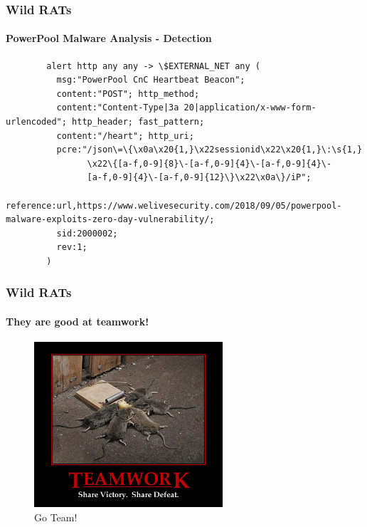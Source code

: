 \documentclass[aspectratio=169]{beamer}
\begin{document}
\begin{frame}[fragile]{}
  \frametitle{Wild RATs}
  \framesubtitle{PowerPool Malware Analysis - Detection}
  \begin{center}
    \begin{tcolorbox}[title=powerpool.rules,colback=black]
    \begin{minipage}{0.5\textwidth}
      \begin{verbatim}
        alert http any any -> \$EXTERNAL_NET any (
          msg:"PowerPool CnC Heartbeat Beacon";
          content:"POST"; http_method;
          content:"Content-Type|3a 20|application/x-www-form-urlencoded"; http_header; fast_pattern;
          content:"/heart"; http_uri;
          pcre:"/json\=\{\x0a\x20{1,}\x22sessionid\x22\x20{1,}\:\s{1,}
                \x22\{[a-f,0-9]{8}\-[a-f,0-9]{4}\-[a-f,0-9]{4}\-
                [a-f,0-9]{4}\-[a-f,0-9]{12}\}\x22\x0a\}/iP";
          reference:url,https://www.welivesecurity.com/2018/09/05/powerpool-malware-exploits-zero-day-vulnerability/;
          sid:2000002;
          rev:1;
        )
      \end{verbatim}
    \end{minipage}
    \end{tcolorbox}
  \end{center}
\end{frame}

\begin{frame}
  \frametitle{Wild RATs}
  \framesubtitle{They are good at teamwork!}
  \begin{center}
    \begin{figure}
      \includegraphics[width=7cm,keepaspectratio]{team_work}
      \caption{Go Team!}
    \end{figure}
  \end{center}
\end{frame}
\end{document}
